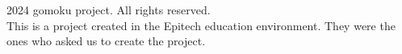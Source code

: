 \documentclass{article}
\begin{document}
\footer
    \begin{minipage}{\textwidth}
        \small \textcopyright{} 2024 gomoku project. All rights reserved. \\
        \small This is a project created in the Epitech education environment.
        \small They were the ones who asked us to create the project.
    \end{minipage}
\endfooter
\end{document}

